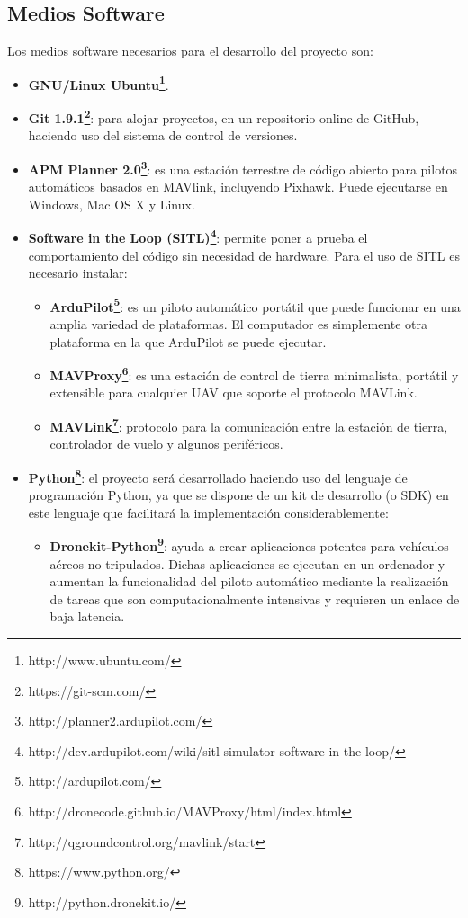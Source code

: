 \documentclass{pre-tfg}
\begin{document}
\subsection{Medios Software}
Los medios software necesarios para el desarrollo del proyecto son:

\begin{itemize}
\item \textbf{GNU/Linux Ubuntu\footnote{http://www.ubuntu.com/}}.
\item \textbf{Git 1.9.1\footnote{https://git-scm.com/}}: para alojar proyectos, en un repositorio online de GitHub, haciendo uso del sistema de control de versiones.
\item \textbf{APM Planner 2.0\footnote{http://planner2.ardupilot.com/}}: es una estación terrestre de código abierto para pilotos automáticos basados en MAVlink, incluyendo Pixhawk. Puede ejecutarse en Windows, Mac OS X y Linux.
\item \textbf{Software in the Loop (SITL)\footnote{http://dev.ardupilot.com/wiki/sitl-simulator-software-in-the-loop/}}: permite poner a prueba el comportamiento del código sin necesidad de hardware. Para el uso de SITL es necesario instalar:
\begin{itemize}
\item \textbf{ArduPilot\footnote{http://ardupilot.com/}}: es un piloto automático portátil que puede funcionar en una amplia variedad de plataformas. El computador es simplemente otra plataforma en la que ArduPilot se puede ejecutar.
\item \textbf{MAVProxy\footnote{http://dronecode.github.io/MAVProxy/html/index.html}}: es una estación de control de tierra minimalista, portátil y extensible para cualquier UAV que soporte el protocolo MAVLink.
\item \textbf{MAVLink\footnote{http://qgroundcontrol.org/mavlink/start}}: protocolo para la comunicación entre la estación de tierra, controlador de vuelo y algunos periféricos.
\end {itemize}
\item \textbf{Python\footnote{https://www.python.org/}}: el proyecto será desarrollado haciendo uso del lenguaje de programación Python, ya que se dispone de un kit de desarrollo (o SDK) en este lenguaje que facilitará la implementación considerablemente:
\begin {itemize}
\item \textbf{Dronekit-Python\footnote{http://python.dronekit.io/}}: ayuda a crear aplicaciones potentes para vehículos aéreos no tripulados. Dichas aplicaciones se ejecutan en un ordenador y aumentan la funcionalidad del piloto automático mediante la realización de tareas que son computacionalmente intensivas y requieren un enlace de baja latencia.

\end{itemize}
\end{itemize}
\end{document}
